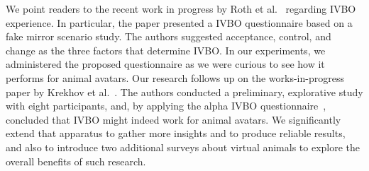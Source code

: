 %


We point readers to the recent work in progress by Roth et al.~ regarding IVBO experience. In particular, the paper presented a IVBO questionnaire based on a fake mirror scenario study. The authors suggested acceptance, control, and change as the three factors that determine IVBO. In our experiments, we administered the proposed questionnaire as we were curious to see how it performs for animal avatars. Our research follows up on the works-in-progress paper by Krekhov et al.~. The authors conducted a preliminary, explorative study with eight participants, and, by applying the alpha IVBO questionnaire~\cite{roth2017alpha}, concluded that IVBO might indeed work for animal avatars. We significantly extend that apparatus to gather more insights and to produce reliable results, and also to introduce two additional surveys about virtual animals to explore the overall benefits of such research.

